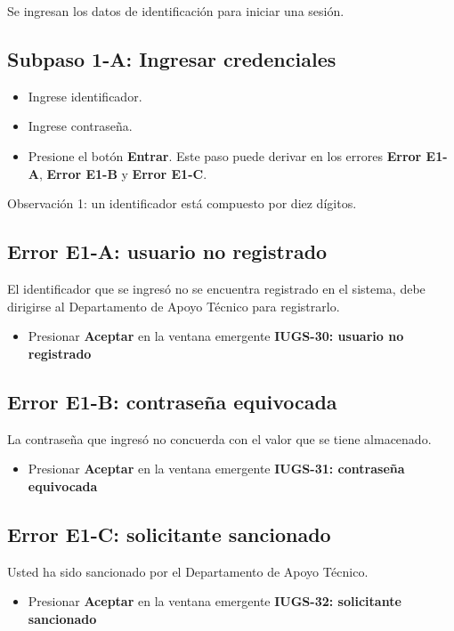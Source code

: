 Se ingresan los datos de identificación para iniciar una sesión.
\subsection{Subpaso 1-A: Ingresar credenciales}
\begin{itemize}
	\item Ingrese identificador.
	\item Ingrese contraseña.
	\item Presione el botón \textbf{Entrar}. Este paso puede derivar
		en los errores \textbf{Error E1-A}, \textbf{Error E1-B} y 
		\textbf{Error E1-C}.
\end{itemize}
Observación 1: un identificador está compuesto por diez dígitos.

\subsection{Error E1-A: usuario no registrado}
El identificador que se ingresó no se encuentra registrado en el sistema,
debe dirigirse al Departamento de Apoyo Técnico para registrarlo.
\begin{itemize}
	\item Presionar \textbf{Aceptar} en la ventana emergente 
		\textbf{IUGS-30: usuario no registrado}
\end{itemize}

\subsection{Error E1-B: contraseña equivocada}
La contraseña que ingresó no concuerda con el valor que se tiene almacenado.
\begin{itemize}
	\item Presionar \textbf{Aceptar} en la ventana emergente 
		\textbf{IUGS-31: contraseña equivocada}
\end{itemize}

\subsection{Error E1-C: solicitante sancionado}
Usted ha sido sancionado por el Departamento de Apoyo Técnico.
\begin{itemize}
	\item Presionar \textbf{Aceptar} en la ventana emergente 
		\textbf{IUGS-32: solicitante sancionado}
\end{itemize}